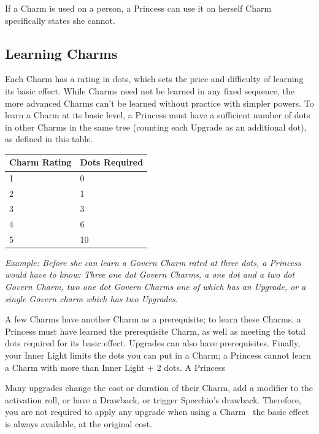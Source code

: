 If a Charm is used on a person, a Princess can use it on herself Charm specifically states she cannot. 


\subsection*{Learning Charms}

Each Charm has a rating in dots, which sets the price and difficulty of learning its basic effect. While Charms need not be learned in any fixed sequence, the more advanced Charms can't be learned without practice with simpler powers. To learn a Charm at its basic level, a Princess must have a sufficient number of dots in other Charms in the same tree (counting each Upgrade as an additional dot), as defined in this table. 

\begin{table}[H]
    \begin{tabular}{|l|l|}
        \hline
        Charm Rating & Dots Required \\ \hline
        1            & 0             \\ \hline
        2            & 1             \\ \hline
        3            & 3             \\ \hline
        4            & 6             \\ \hline
        5            & 10            \\
        \hline
    \end{tabular}
\end{table}

\textit{Example: Before she can learn a Govern Charm rated at three dots, a Princess would have to know: Three one dot Govern Charms, a one dot and a two dot Govern Charm, two one dot Govern Charms one of which has an Upgrade, or a single Govern charm which has two Upgrades.}

A few Charms have another Charm as a prerequisite; to learn these Charms, a Princess must have learned the prerequisite Charm, as well as meeting the total dots required for its basic effect. Upgrades can also have prerequisites. Finally, your Inner Light limits the dots you can put in a Charm; a Princess cannot learn a Charm with more than Inner Light + 2 dots. A Princess 

Many upgrades change the cost or duration of their Charm, add a modifier to the activation roll, or have a Drawback, or trigger Specchio's drawback. Therefore, you are not required to apply any upgrade when using a Charm \textendash\, the basic effect is always available, at the original cost. 

